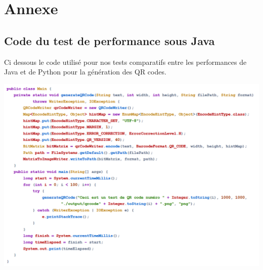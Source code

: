 \documentclass[a4paper,12pt]{article}
\begin{document}
\begin{itemize}

\end{itemize}

\newpage
\section{Annexe}

\subsection{Code du test de performance sous Java}
Ci dessous le code utilisé pour nos tests comparatifs entre les performances de Java et de Python pour la génération des QR codes.

\noindent\includegraphics[width=\textwidth]{code-java.png}
\end{document}
